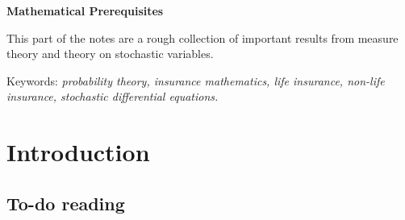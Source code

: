 \documentclass[a4paper,10pt,openany]{book}
\begin{document}
\textbf{Mathematical Prerequisites}

This part of the notes are a rough collection of important results from measure theory and theory on stochastic variables.

\vspace{5pt}
\noindent Keywords: \emph{probability theory, insurance mathematics, life insurance, non-life insurance, stochastic differential equations.}

\newpage

\begin{spacing}{1}
\tableofcontents
\end{spacing}

\newpage

\setcounter{page}{1}
\pagestyle{fancy}
\fancyhf{}
\renewcommand{\headrulewidth}{0pt}
\fancyhead[LE]{\fontsize{11}{12} \selectfont\nouppercase{\thepage}}
\fancyhead[RE]{\fontsize{11}{12} \selectfont\nouppercase{\leftmark}}
\fancyhead[LO]{\fontsize{11}{12} \selectfont\nouppercase{\rightmark}}
\fancyhead[RO]{\fontsize{11}{12} \selectfont\nouppercase{\thepage}}
\allowdisplaybreaks
\setlength{\abovedisplayskip}{10pt}
\setlength{\belowdisplayskip}{10pt}
\setlength{\abovedisplayshortskip}{-12pt}%
\setlength{\belowdisplayshortskip}{0pt}
\hypertarget{introduction}{%
\chapter*{Introduction}\label{introduction}}

\hypertarget{to-do-reading}{%
\section*{To-do reading}\label{to-do-reading}}
\end{document}
